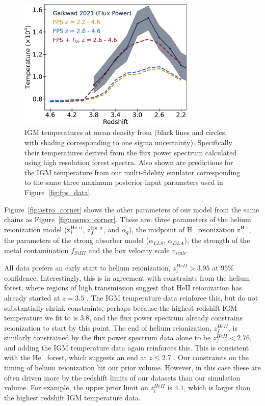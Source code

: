 \begin{figure}
    \centering
    \includegraphics[width=0.75\textwidth]{figures/t0_best_fit.pdf}
    \caption{\label{fig:temp_data}
    IGM temperatures at mean density from \protect\cite{2021MNRAS.506.4389G} (black lines and circles, with shading corresponding to one sigma uncertainty).
    Specifically their temperatures derived from the flux power spectrum calculated using high resolution \lya forest spectra.
    Also shown are predictions for the IGM temperature from our multi-fidelity emulator corresponding to the same three maximum posterior input parameters used in Figure~\protect\ref{fig:fps_data}.
    }
\end{figure}

Figure~\ref{fig:astro_corner} shows the other parameters of our model from the same chains as Figure~\ref{fig:cosmo_corner}.
These are: three parameters of the helium reionization model (z$^{\text{He~{\sc ii}}}_i$, z$^{\text{He~{\sc ii}}}_f$, and $\alpha_q$), the midpoint of H~{} reionization z$^{\text{H~{\sc i}}}$, the parameters of the strong absorber model ($\alpha_{LLS}$, $\alpha_{DLA}$), the strength of the metal contamination $f_{SiIII}$ and the box velocity scale $v_{scale}$.

All data prefers an early start to helium reionization, $z_i^{HeII} > 3.95$ at $95\%$ confidence.
Interestingly, this is in agreement with constraints from the helium \lya forest, where regions of high transmission suggest that HeII reionization has already started at $z = 3.5$ \cite{2016ApJ...825..144W, 2021ApJ...912...38M}.
The IGM temperature data reinforce this, but do not substantially shrink constraints, perhaps because the highest redshift IGM temperature we fit to is $3.8$, and the flux power spectrum already constrains reionization to start by this point.
The end of helium reionization, $z_f^{HeII}$, is similarly constrained by the flux power spectrum data alone to be $z_f^{HeII} < 2.76$, and adding the IGM temperature data again reinforces this.
This is consistent with the He~{} \lya forest, which suggests an end at $z \leq 2.7$ \cite{2009ApJ...704L..89M, 2011ApJ...733L..24W, 2019ApJ...875..111W}.
Our constraints on the timing of helium reionization hit our prior volume. However, in this case these are often driven more by the redshift limits of our datasets than our simulation volume. For example, the upper prior limit on $z^{HeII}_i$ is $4.1$, which is larger than the highest redshift IGM temperature data.


